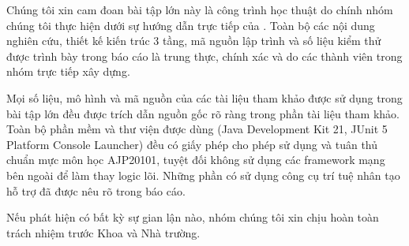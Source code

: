 \begin{declaration}

Chúng tôi xin cam đoan bài tập lớn này là công trình học thuật do chính nhóm
chúng tôi thực hiện dưới sự hướng dẫn trực tiếp của \dauGVHD. Toàn bộ các nội
dung nghiên cứu, thiết kế kiến trúc 3 tầng, mã nguồn lập trình và số liệu kiểm
thử được trình bày trong báo cáo là trung thực, chính xác và do các thành viên
trong nhóm trực tiếp xây dựng.

Mọi số liệu, mô hình và mã nguồn của các tài liệu tham khảo được sử dụng trong
bài tập lớn đều được trích dẫn nguồn gốc rõ ràng trong phần tài liệu tham
khảo. Toàn bộ phần mềm và thư viện được dùng (Java Development Kit 21, JUnit 5
Platform Console Launcher) đều có giấy phép cho phép sử dụng và tuân thủ chuẩn
mực môn học AJP20101, tuyệt đối không sử dụng các framework mạng bên ngoài để
làm thay logic lõi. Những phần có sử dụng công cụ trí tuệ nhân tạo hỗ trợ đã
được nêu rõ trong báo cáo.

Nếu phát hiện có bất kỳ sự gian lận nào, nhóm chúng tôi xin chịu hoàn toàn
trách nhiệm trước Khoa và Nhà trường.

\vspace{1.4em}
\hfill{}

\end{declaration}
